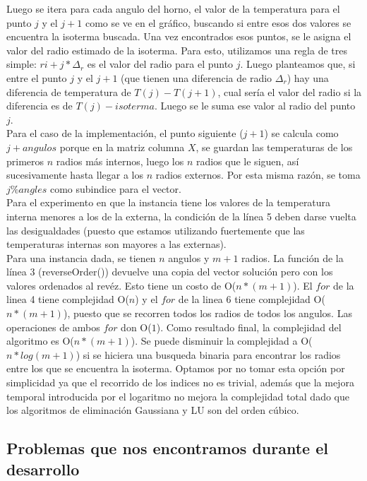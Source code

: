 Luego se itera para cada angulo del horno, el valor de la temperatura para el punto $j$ y el $j+1$ como se ve en el gráfico, buscando si entre esos dos valores se encuentra la isoterma buscada. Una vez encontrados esos puntos, se le asigna el valor del radio estimado de la isoterma. Para esto, utilizamos una regla de tres simple: $ri + j *\Delta_r $ es el valor del radio para el punto $j$. Luego planteamos que, si entre el punto $j$ y el $j+1$ (que tienen una diferencia de radio $\Delta_r$) hay una diferencia de temperatura de $T(j) - T(j+1)$, cual sería el valor del radio si la diferencia es de $T(j) - isoterma$. Luego se le suma ese valor al radio del punto $j$.\\
Para el caso de la implementación, el punto siguiente ($j+1$) se calcula como $j+angulos$ porque en la matriz columna $X$, se guardan las temperaturas de los primeros $n$ radios más internos, luego los $n$ radios que le siguen, así sucesivamente hasta llegar a los $n$ radios externos. Por esta misma razón, se toma $j \% angles$ como subindice para el vector.\\
Para el experimento en que la instancia tiene los valores de la temperatura interna menores a los de la externa, la condición de la línea 5 deben darse vuelta las desigualdades (puesto que estamos utilizando fuertemente que las temperaturas internas son mayores a las externas).\\

Para una instancia dada, se tienen $n$ angulos y $m+1$ radios. La función de la línea 3 (reverseOrder()) devuelve una copia del vector solución pero con los valores ordenados al revéz. Esto tiene un costo de O($n*(m+1)$). El $for$ de la linea 4 tiene complejidad O($n$) y el $for$ de la linea 6 tiene complejidad O($n*(m+1)$), puesto que se recorren todos los radios de todos los angulos. Las operaciones de ambos $for$ don O($1$). Como resultado final, la complejidad del algoritmo es O($n*(m+1)$). Se puede disminuir la complejidad a O($n*log(m+1)$) si se hiciera una busqueda binaria para encontrar los radios entre los que se encuentra la isoterma. Optamos por no tomar esta opción por simplicidad ya que el recorrido de los indices no es trivial, además que la mejora temporal introducida por el logaritmo no mejora la complejidad total dado que los algoritmos de eliminación Gaussiana y LU son del orden cúbico.





\subsection{Problemas que nos encontramos durante el desarrollo}

